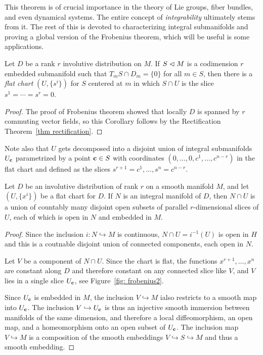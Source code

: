 This theorem is of crucial importance in the theory of Lie groups, fiber bundles, and even dynamical systems. The entire concept of \emph{integrability} ultimately stems from it. The rest of this \subsect is devoted to characterizing integral submanifolds and proving a global version of the Frobenius theorem, which will be useful is some applications.

\begin{cor}\label{cor 19.13 Lee}
    Let $D$ be a rank $r$ involutive distribution on $M$. If $S\sub M$ is a codimension $r$ embedded submanifold such that $T_mS\cap D_m=\{0\}$ for all $m\in S$, then there is a \emph{flat chart} $(U,\{s^i\})$ for $S$ centered at $m$ in which $S\cap U$ is the slice $s^1=\cdots=s^r=0$.
\end{cor}
\begin{proof}
    The proof of Frobenius theorem showed that locally $D$ is spanned by $r$ commuting vector fields, so this Corollary follows by the Rectification Theorem~\ref{thm rectification}.
\end{proof}

Note also that $U$ gets decomposed into a disjoint union of integral submanifolds $U_{\bf{c}}$ parametrized by a point $\bf{c}\in S$ with coordinates $(0,\ldots,0,c^1,\ldots,c^{n-r})$ in the flat chart and defined as the slices $s^{r+1}=c^1,\ldots, s^n=c^{n-r}$.

\begin{prop}\label{prop 19.16 Lee}
    Let $D$ be an involutive distribution of rank $r$ on a smooth manifold $M$, and let $(U,\{x^i\})$ be a flat chart for $D$. If $N$ is an integral manifold of $D$, then $N\cap U$ is a union of countably many disjoint open subsets of parallel $r$-dimensional slices of $U$, each of which is open in $N$ and embedded in $M$.
\end{prop}
\begin{proof}
    Since the inclusion $i:N\hookrightarrow M$ is continuous, $N\cap U=i^{-1}(U)$ is open in $H$ and this is a coutnable disjoint union of connected components, each open in $N$.

    Let $V$ be a component of $N\cap U$. Since the chart is flat, the functions $x^{r+1},\ldots,x^n$ are constant along $D$ and therefore constant on any connected slice like $V$, and $V$ lies in a single slice $U_{\bf{c}}$, see Figure~\ref{fig: frobenius2}.

    Since $U_{\bf{c}}$ is embedded in $M$, the inclusion $V\hookrightarrow M$ ialso restricts to a smooth map into $U_{\bf{c}}$. The inclusion $V\hookrightarrow U_{\bf{c}}$ is thus an injective smooth immersion between manifolds of the same dimension, and therefore a local diffeomorphism, an open map, and a homeomorphism onto an open subset of $U_{\bf{c}}$. The inclusion map $V\hookrightarrow M$ is a composition of the smooth embeddings $V\hookrightarrow S\hookrightarrow M$ and thus a smooth embedding.
\end{proof}


